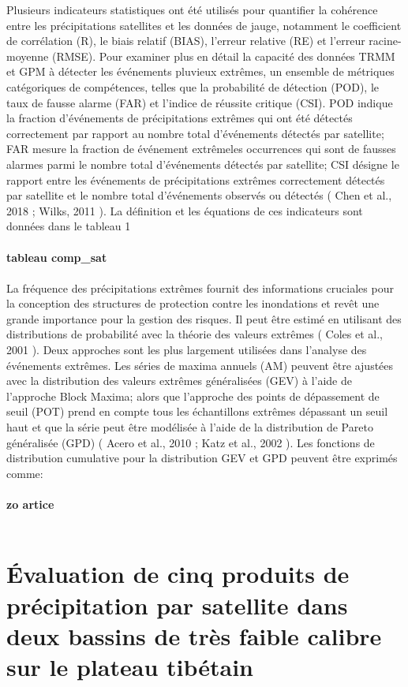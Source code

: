 Plusieurs indicateurs statistiques ont été utilisés pour quantifier la cohérence entre les précipitations satellites et les données de jauge, notamment le coefficient de corrélation (R), le biais relatif (BIAS), l’erreur relative (RE) et l’erreur racine-moyenne (RMSE). Pour examiner plus en détail la capacité des données TRMM et GPM à détecter les événements pluvieux extrêmes, un ensemble de métriques catégoriques de compétences, telles que la probabilité de détection (POD), le taux de fausse alarme (FAR) et l’indice de réussite critique (CSI). POD indique la fraction d'événements de précipitations extrêmes qui ont été détectés correctement par rapport au nombre total d'événements détectés par satellite; FAR mesure la fraction de événement extrêmeles occurrences qui sont de fausses alarmes parmi le nombre total d'événements détectés par satellite; CSI désigne le rapport entre les événements de précipitations extrêmes correctement détectés par satellite et le nombre total d'événements observés ou détectés ( Chen et al., 2018 ; Wilks, 2011 ). La définition et les équations de ces indicateurs sont données dans le tableau 1\\ \ \\
\textbf{tableau comp_sat}\\ \ \\
La fréquence des précipitations extrêmes fournit des informations cruciales pour la conception des structures de protection contre les inondations et revêt une grande importance pour la gestion des risques. Il peut être estimé en utilisant des distributions de probabilité avec la théorie des valeurs extrêmes ( Coles et al., 2001 ). Deux approches sont les plus largement utilisées dans l'analyse des événements extrêmes. Les séries de maxima annuels (AM) peuvent être ajustées avec la distribution des valeurs extrêmes généralisées (GEV) à l’aide de l’approche Block Maxima; alors que l’approche des points de dépassement de seuil (POT) prend en compte tous les échantillons extrêmes dépassant un seuil haut et que la série peut être modélisée à l’aide de la distribution de Pareto généralisée (GPD) ( Acero et al., 2010 ; Katz et al., 2002 ). Les fonctions de distribution cumulative pour la distribution GEV et GPD peuvent être exprimés comme:\\ \ \\
\textbf{zo artice}\\ \ \\
\cite{fang_evaluation_2019}
\section{Évaluation de cinq produits de précipitation par satellite dans deux bassins de très faible calibre sur le plateau tibétain}
